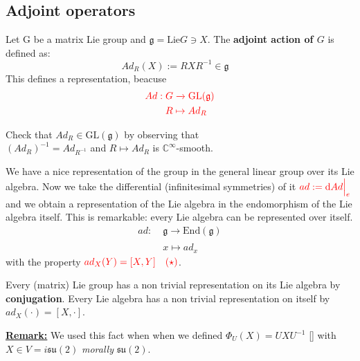 \documentclass[../main.tex]{subfiles}
\begin{document}
\subsection{Adjoint operators}
Let G be a matrix Lie group and $\mathfrak{g}=\textrm{Lie}G\ni X$. The \textbf{adjoint action of $G$} is defined as:
\[
Ad_R(X):=RXR^{-1}\in\mathfrak{g} \quad
\]
This defines a representation, beacuse
\[
{\color{red}
\begin{split}
    Ad:&\;G\xrightarrow[]{}\text{GL}(\mathfrak{g})\\
    &\;R\mapsto Ad_R
\end{split}}
\]
\begin{exercise}
Check that $Ad_R\in\textrm{GL}(\mathfrak{g})$ by observing that\\ $(Ad_R)^{-1}=Ad_{R^{-1}}$ and $R\mapsto Ad_R$ is $\mathbb{C}^{\infty}$-smooth.
\end{exercise}
We have a nice representation of the group in the general linear group over its Lie algebra. Now we take the differential (infinitesimal symmetries) of it ${\color{red}ad:=\dd Ad\Bigr|_{\substack{e}}}$ and we obtain a representation of the Lie algebra in the endomorphism of the Lie algebra itself. This is remarkable: every Lie algebra can be represented over itself. 
{\color{red}
\begin{align*}
    ad:&\;\mathfrak{g}\xrightarrow[]{}\text{End}(\mathfrak{g})\\
    &\;x\mapsto ad_x
\end{align*}}
with the property ${\color{red}ad_X(Y)=[X,Y] \quad (\star)}$.

{\selectfont{}\relax} Every (matrix) Lie group has a non trivial representation on its Lie algebra by \textbf{conjugation}. Every Lie algebra has a non trivial representation on itself by {\color{red}$ad_X(\cdot)=[X,\cdot]$}.

\underline{\textbf{Remark:}} We used this fact when when we defined $\Phi_U(X)=UXU^{-1}$ [] with $X\in V=i\mathfrak{su}(2)$ \textit{morally} $\mathfrak{su}(2)$.
\end{document}
